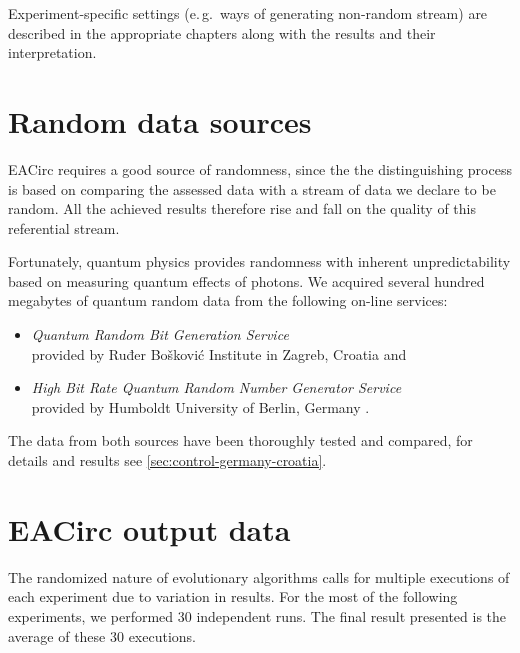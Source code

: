 \documentclass[12pt,oneside]{fithesis2}		%
\renewcommand{\_}{\leavevmode \kern0.0em\vbox{\hrule width0.4em}}
\newcommand{\squarebullet}{\textcolor{black}{\raisebox{0.15em}{\rule{4pt}{4pt}}}}
\newenvironment{myItemize}{
  \begin{itemize}[leftmargin=2em,rightmargin=1em,itemsep=\parskip ,parsep=0em,topsep=0em,partopsep=0em]
  \renewcommand{\labelitemi}{\squarebullet}
  \renewcommand{\labelitemii}{$\diamond$}
}{
  \end{itemize}
}
\begin{document}
Experiment-specific settings (e.\,g.\ ways of generating non-random stream) are described in the 
appropriate chapters along with the results and their interpretation.

\section{Random data sources}
\label{sec:settings-random}

EACirc requires a good source of randomness, since the the distinguishing process is based on comparing the assessed data
with a stream of data we declare to be random. All the achieved results therefore rise and fall 
on the quality of this referential stream.

Fortunately, quantum physics provides randomness with inherent unpredictability based on measuring quantum effects of photons. 
We acquired several hundred megabytes of quantum random data from the following on-line services:
\begin{myItemize}
\item \textit{Quantum Random Bit Generation Service}\\
provided by Ruđer Bošković Institute in Zagreb, Croatia \parencite{qrng-service-croatia} and
\item \textit{High Bit Rate Quantum Random Number Generator Service}\\
provided by Humboldt University of Berlin, Germany \parencite{qrng-service-germany}.
\end{myItemize}
The data from both sources have been thoroughly tested and compared, for details and results 
see \autoref{sec:control-germany-croatia}.

\section{EACirc output data}
\label{sec:settings-eacirc-output}

The randomized nature of evolutionary algorithms calls for multiple executions of each experiment due to variation in results.
For the most of the following experiments, we performed 30 independent runs. The final result presented is the average
of these 30 executions.
\end{document}
